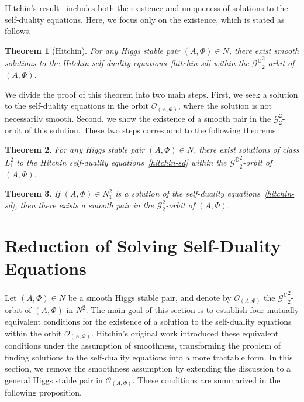 \documentclass[a4paper]{amsart}
\newtheorem{theorem}{Theorem}[section]
\theoremstyle{definition}
\theoremstyle{remark}
\numberwithin{equation}{section}
\begin{document}
Hitchin’s result~\cite[Theorem 4.3]{hitchin1987self} includes both the existence and uniqueness of solutions to the self-duality equations. Here, we focus only on the existence, which is stated as follows.

\begin{theorem}[Hitchin]\label{main}
For any Higgs stable pair $(A, \Phi) \in N$, there exist smooth solutions to the Hitchin self-duality equations~\eqref{hitchin-sd} within the ${\mathscr{G}^\mathbb{C}}_2^2$-orbit of $(A, \Phi)$.
\end{theorem}

We divide the proof of this theorem into two main steps. First, we seek a solution to the self-duality equations in the orbit $\mathcal{O}_{(A,\Phi)}$, where the solution is not necessarily smooth. Second, we show the existence of a smooth pair in the $\mathscr{G}_2^2$-orbit of this solution. These two steps correspond to the following theorems:

\begin{theorem}\label{main1}
For any Higgs stable pair $(A, \Phi) \in N$, there exist solutions of class $L_1^2$ to the Hitchin self-duality equations~\eqref{hitchin-sd} within the ${\mathscr{G}^\mathbb{C}}_2^2$-orbit of $(A, \Phi)$. 
\end{theorem}

\begin{theorem}\label{main2}
If $(A, \Phi) \in N_1^2$ is a solution of the self-duality equations~\eqref{hitchin-sd}, then there exists a smooth pair in the $\mathscr{G}_2^2$-orbit of $(A, \Phi)$.
\end{theorem}

\section{Reduction of Solving Self-Duality Equations}

Let $(A, \Phi) \in N$ be a smooth Higgs stable pair, and denote by $\mathcal{O}_{(A, \Phi)}$  the ${\mathscr{G}^\mathbb{C}}_2^2$-orbit of $(A, \Phi)$ in $N_1^2$.  The main goal of this section is to establish four mutually equivalent conditions for the existence of a solution to the self-duality equations within the orbit $\mathcal{O}_{(A, \Phi)}$. Hitchin's original work introduced these equivalent conditions under the assumption of smoothness, transforming the problem of finding solutions to the self-duality equations into a more tractable form. In this section, we remove the smoothness assumption by extending the discussion to a general Higgs stable pair in $\mathcal{O}_{(A, \Phi)}$. These conditions are summarized in the following proposition.
\end{document}
